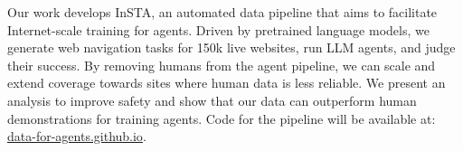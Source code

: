 Our work develops InSTA, an automated data pipeline that aims to facilitate Internet-scale training for agents. Driven by pretrained language models, we generate web navigation tasks for 150k live websites, run LLM agents, and judge their success. By removing humans from the agent pipeline, we can scale and extend coverage towards sites where human data is less reliable. We present an analysis to improve safety and show that our data can outperform human demonstrations for training agents. Code for the pipeline will be available at: \href{https://data-for-agents.github.io}{data-for-agents.github.io}.